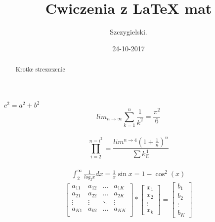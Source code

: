\documentclass[a4paper,12pt]{article}
\begin{document}
\title{Cwiczenia z LaTeX mat}
\author{Szczygielski.}
\date {24-10-2017}
\maketitle
\begin {abstract} {Krotke streszczenie}
\end {abstract}
$c^{2}=a^{2}+b^{2}$\\
$$lim_{n \to \infty}
\sum_{k=1}^n \frac{1}{k^2}
= \frac{\pi^2}{6}$$\\
$$\prod_{i=2}^{n=i^2} =\frac{lim^{n \to {4}}(1+\frac{1}{n})^n}{\sum k\frac{1}{n}}$$\\
\begin {eqnarray}
\int_{2}^{\infty} \frac{1}{log_{2}x}dx=\frac{1}{x}\sin x=1 - \cos^2(x)
\end {eqnarray}
$$\left[ \begin{array}{cccc}
a_{11} & a_{12} & \ldots & a_{1K}\\
a_{21} & a_{22} & \ldots & a_{2K}\\
\vdots & \vdots & \ddots & \vdots\\
a_{K1} & a_{k2} & \ldots & a_{KK}\\
\end {array} \right] *\left[\begin{array}{c}
x_{1}\\
x_{2}\\
\vdots\\
x_{k}
\end{array} \right]= \left[ \begin {array}{c}
b_{1}\\
b_{2}\\
\vdots\\
b_{K}
\end {array} \right]
$$
\end{document}
